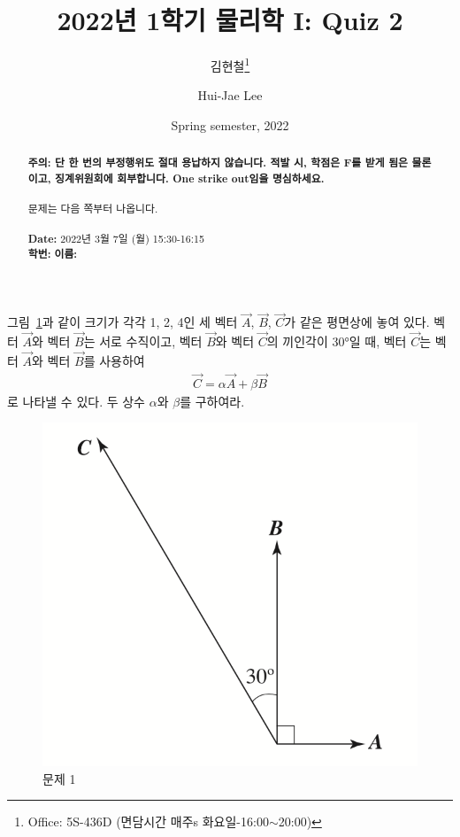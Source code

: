 \documentclass[APS,floatfix,nofootinbib,superscriptaddress,fleqn,preprint]{revtex4}
\begin{document}
\title{\Large 2022년 1학기 물리학 I: Quiz 2}
\author{김현철\footnote{Office: 5S-436D (면담시간 매주s
    화요일-16:00$\sim$20:00)}} 
\author{Hui-Jae Lee} 
\date{Spring semester, 2022}


\vspace{1.cm}
\begin{abstract}
\noindent \textbf{ {\color{red}주의}: \color{blue} 단 한 번의 부정행위도 절대
  용납하지 않습니다. 적발 시, 학점은 F를 받게 됨은 물론이고,
  징계위원회에 회부합니다. One strike out임을 명심하세요.}\\
\\
문제는 다음 쪽부터 나옵니다.  \\ \\
{\bf Date:} 2022년 3월 7일 (월) 15:30-16:15 
\\
{\bf 학번:} \hspace{4cm}
{\bf 이름:} 

\end{abstract}
\maketitle

그림~\ref{fig:1}과 같이 크기가 각각 1, 2, 4인 세 벡터 $\vec{A}$,
$\vec{B}$, $\vec{C}$가 같은 평면상에 놓여 있다. 벡터 $\vec{A}$와 벡터
$\vec{B}$는 서로 수직이고, 벡터 $\vec{B}$와 벡터 $\vec{C}$의 끼인각이 30°일 때,
벡터 $\vec{C}$는 벡터 $\vec{A}$와 벡터 $\vec{B}$를 사용하여
\begin{align*}
\vec{C} = \alpha \vec{A} + \beta\vec{B}  
\end{align*}
로 나타낼 수 있다. 두 상수 $\alpha$와 $\beta$를 구하여라. 
\begin{figure}[ht]
  \centering
\includegraphics[scale=0.6]{Qfig3-1-20220307.png}  
  \caption{문제 1}
  \label{fig:1}
\end{figure} 
\end{document}
